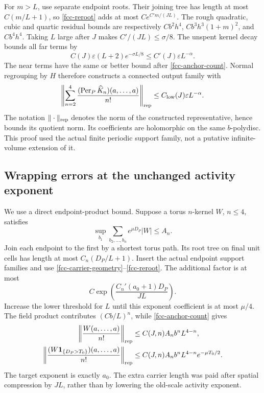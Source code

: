 \documentclass[11pt]{article}
\theoremstyle{remark}
\begin{document}
For \(m>L\), use separate endpoint roots. Their
joining tree has length at most \(C(m/L+1)\), so
\eqref{fcc-reroot} adds at most
\(C e^{C'm/(JL)}\). The rough quadratic, cubic and
quartic residual bounds are respectively
\(Cb^2h^4\), \(Cb^3h^3(1+m)^2\), and \(Cb^4h^4\).
Taking \(L\) large after \(J\) makes \(C'/(JL)\le\sigma/8\).
The unspent kernel decay bounds all far terms by
\[
 C(J)\varepsilon(L+2)e^{-\sigma L/8}
       \le C'(J)\varepsilon L^{-\alpha}.
\]
The near terms have the same or better bound after
\eqref{fcc-anchor-count}. Normal regrouping by \(H\)
therefore constructs a connected output family with
\begin{equation}
 \left\|\sum_{n=2}^4
       \frac{(\operatorname{Per}_P\widehat K_n)
                       (a,\ldots,a)}{n!}\right\|_{\rm rep}
       \le C_{\rm low}(J)\varepsilon L^{-\alpha}.
 \label{fcc-canceled-estimate}
\end{equation}
The notation \(\|\cdot\|_{\rm rep}\) denotes the norm
of the constructed representative, hence bounds its
quotient norm. Its coefficients are holomorphic on
the same \(b\)-polydisc. This proof used the actual
finite periodic support family, not a putative
infinite-volume extension of it.

\subsection{Wrapping errors at the unchanged activity exponent}
\label{fcc-errors-section}

We use a direct endpoint-product bound. Suppose a torus
\(n\)-kernel \(W\), \(n\le4\), satisfies
\begin{equation}
 \sup_{b_1}\sum_{b_2,\ldots,b_n}e^{\mu D_P}|W|
                         \le A_n.
 \label{fcc-error-kernel}
\end{equation}
Join each endpoint to the first by a shortest torus
path. Its root tree on final unit cells has length
at most \(C_n(D_P/L+1)\). Insert the actual endpoint
support families and use
\eqref{fcc-carrier-geometry}--\eqref{fcc-reroot}.
The additional factor is at most
\[
 C\exp\!\left(\frac{C_n'(a_0+1)D_P}{JL}\right).
\]
Increase the lower threshold for \(L\) until this
exponent coefficient is at most \(\mu/4\).
The field product contributes \((Cb/L)^n\), while
\eqref{fcc-anchor-count} gives
\begin{align}
 \left\|\frac{W(a,\ldots,a)}{n!}\right\|_{\rm rep}
   &\le C(J,n)A_n b^n L^{4-n},\notag\\
 \left\|\frac{(W{\bf1}_{\{D_P>T_0\}})(a,\ldots,a)}
                                      {n!}\right\|_{\rm rep}
   &\le C(J,n)A_n b^n L^{4-n}e^{-\mu T_0/2}.
 \label{fcc-tail-localization}
\end{align}
The target exponent is exactly \(a_0\). The extra
carrier length was paid after spatial compression
by \(JL\), rather than by lowering the old-scale
activity exponent.
\end{document}
